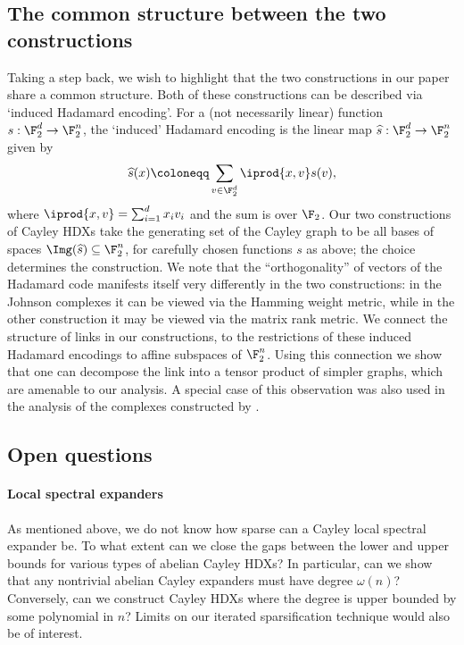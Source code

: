 \subsection{The common structure between the two constructions} \label{sec:intro-common-struct}
Taking a step back, we wish to highlight that the two constructions in our paper share a common structure. Both of these constructions can be described via `induced Hadamard encoding'. For a (not necessarily linear) function \(s:\F_2^d \to \F_2^n\), the `induced' Hadamard encoding is the linear map \(\widehat{s}:\F_2^d \to \F_2^n\) given by
\[\widehat{s}(x) \coloneqq \sum_{v \in \F_2^d} \iprod{x,v} s(v),\]
where \(\iprod{x,v} = \sum_{i=1}^d x_i v_i\) and the sum is over \(\F_2\). Our two constructions of Cayley HDXs take the generating set of the Cayley graph to be all bases of spaces \(\Img(\widehat{s}) \subseteq \F_2^n\), for carefully chosen functions \(s\) as above; the choice determines the construction. We note that the ``orthogonality'' of vectors of the Hadamard code manifests itself very differently in the two constructions: in the Johnson complexes it can be viewed via the Hamming weight metric, while in the other construction it may be viewed via the matrix rank metric. We connect the structure of links in our constructions, to the restrictions of these induced Hadamard encodings to affine subspaces of \(\F_2^n\). Using this connection we show that one can decompose the link into a tensor product of simpler graphs, which are amenable to our analysis. A special case of this observation was also used in the analysis of the complexes constructed by \cite{Golowich2023}.  

\subsection{Open questions} \label{sec:intro-open-questions}
\paragraph{Local spectral expanders} As mentioned above, we do not know how sparse can a Cayley local spectral expander be. To what extent can we close the gaps between the lower and upper bounds for various types of abelian Cayley HDXs? In particular, can we show that any nontrivial abelian Cayley expanders  must have degree $\omega(n)$? Conversely, can we construct Cayley HDXs where the degree is upper bounded by some polynomial in \(n\)? Limits on our iterated sparsification technique would also be of interest.

